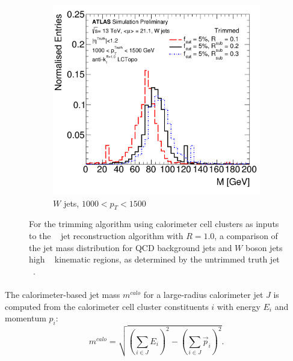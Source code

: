 \begin{figure}[htbp!]
\begin{subfigure}[b]{0.4\textwidth}
        \includegraphics[width=\textwidth]{figures/object/trim_w_highpt}
        \caption{$W$ jets, $1000 < p_{T} < 1500$ \GeV}
        \label{fig:obj_trim_w_highpt}
    \end{subfigure}
   \caption{
   For the trimming algorithm using calorimeter cell clusters as inputs to the \akt~ jet reconstruction algorithm with $R = 1.0$, a comparison of the jet mass distribution for QCD background jets and $W$ boson jets high \pt~ kinematic regions, as determined by the untrimmed truth jet \pt~.}
  \label{fig:obj_trim_highpt}
\end{figure}

\paragraph{}
The calorimeter-based jet mass $m^{calo}$ for  a large-radius calorimeter jet $J$ is computed from the calorimeter cell cluster constituents $i$ with energy $E_i$ and momentum $p_i$:
\begin{equation}
m^{calo} = \sqrt{\left(\sum_{i\in J}E_i\right)^2-\left(\sum_{i\in J}\vec{p}_i\right)^2}.
\end{equation}

